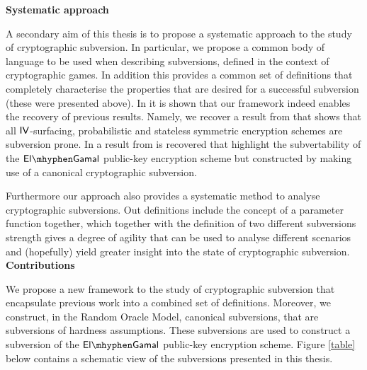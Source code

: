 \noindent\textbf{Systematic approach}

A secondary aim of this thesis is to propose a systematic approach to the study of cryptographic subversion. In particular, we propose a common body of language to be used when describing subversions, defined in the context of cryptographic games. In addition this provides a common set of definitions that completely characterise the properties that are desired for a successful subversion (these were presented above). In  it is shown that our framework indeed enables the recovery of previous results. Namely, we recover a result from \cite{DBLP:secSym} that shows that all $\mathsf{IV}$-surfacing, probabilistic and stateless symmetric encryption schemes are subversion prone. In  a result from \cite{DBLP:conf/crypto/YoungY96} is recovered that highlight the subvertability of the $\elGamal$ public-key encryption scheme but constructed by making use of a canonical cryptographic subversion.

Furthermore our approach also provides a systematic method to analyse cryptographic subversions. Out definitions include the concept of a parameter function together, which together with the definition of two different subversions strength gives a degree of agility that can be used to analyse different scenarios and (hopefully) yield greater insight into the state of cryptographic subversion. \\

\noindent\textbf{Contributions}

We propose a new framework to the study of cryptographic subversion that encapsulate previous work into a combined set of definitions. Moreover, we construct, in the Random Oracle Model, canonical subversions, that are subversions of hardness assumptions. These subversions are used to construct a subversion of the $\elGamal$ public-key encryption scheme. Figure \ref{table} below contains a schematic view of the subversions presented in this thesis. 

